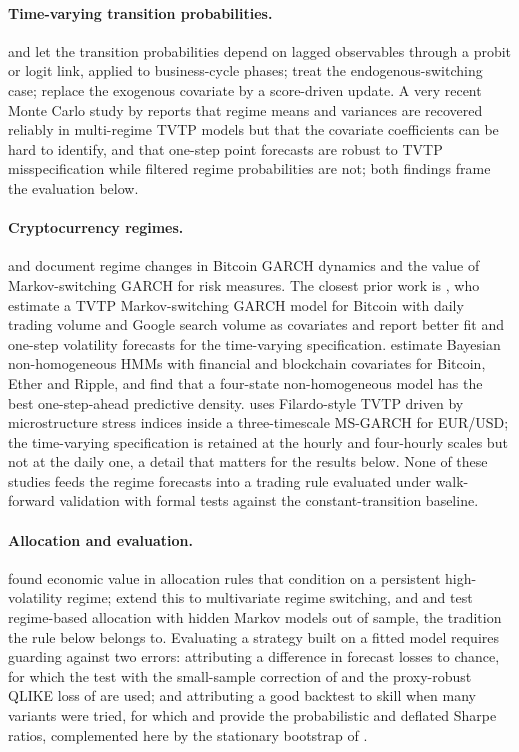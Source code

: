 \documentclass[11pt,a4paper]{article}
\begin{document}
\paragraph{Time-varying transition probabilities.} \citet{filardo1994} and \citet{dlw1994} let the transition probabilities depend on lagged observables through a probit or logit link, applied to business-cycle phases; \citet{kps2008} treat the endogenous-switching case; \citet{bazzi2017} replace the exogenous covariate by a score-driven update. A very recent Monte Carlo study by \citet{modee2026} reports that regime means and variances are recovered reliably in multi-regime TVTP models but that the covariate coefficients can be hard to identify, and that one-step point forecasts are robust to TVTP misspecification while filtered regime probabilities are not; both findings frame the evaluation below.

\paragraph{Cryptocurrency regimes.} \citet{ardia2019} and \citet{caporale2019} document regime changes in Bitcoin GARCH dynamics and the value of Markov-switching GARCH for risk measures. The closest prior work is \citet{tan2021}, who estimate a TVTP Markov-switching GARCH model for Bitcoin with daily trading volume and Google search volume as covariates and report better fit and one-step volatility forecasts for the time-varying specification. \citet{koki2020,koki2022} estimate Bayesian non-homogeneous HMMs with financial and blockchain covariates for Bitcoin, Ether and Ripple, and find that a four-state non-homogeneous model has the best one-step-ahead predictive density. \citet{chaudhary2026} uses Filardo-style TVTP driven by microstructure stress indices inside a three-timescale MS-GARCH for EUR/USD; the time-varying specification is retained at the hourly and four-hourly scales but not at the daily one, a detail that matters for the results below. None of these studies feeds the regime forecasts into a trading rule evaluated under walk-forward validation with formal tests against the constant-transition baseline.

\paragraph{Allocation and evaluation.} \citet{angbekaert2002} found economic value in allocation rules that condition on a persistent high-volatility regime; \citet{guidolin2007} extend this to multivariate regime switching, and \citet{bulla2011} and \citet{nystrup2015} test regime-based allocation with hidden Markov models out of sample, the tradition the rule below belongs to. Evaluating a strategy built on a fitted model requires guarding against two errors: attributing a difference in forecast losses to chance, for which the \citet{dm1995} test with the small-sample correction of \citet{hln1997} and the proxy-robust QLIKE loss of \citet{patton2011} are used; and attributing a good backtest to skill when many variants were tried, for which \citet{bailey2014pseudo} and \citet{bailey2014dsr} provide the probabilistic and deflated Sharpe ratios, complemented here by the stationary bootstrap of \citet{politisromano1994}.
\end{document}
